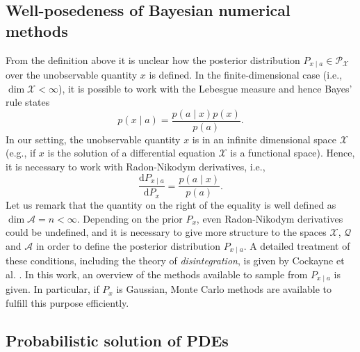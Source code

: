 \documentclass{scrartcl}
\theoremstyle{definition}
\theoremstyle{remark}
\numberwithin{definition}{section}
\numberwithin{remark}{section}
\newcommand{\dd}{\mathrm{d}}
\begin{document}
\subsection{Well-posedeness of Bayesian numerical methods}

From the definition above it is unclear how the posterior distribution $P_{x\mid a} \in \mathcal P_{\mathcal X}$ over the unobservable quantity $x$ is defined. In the finite-dimensional case (i.e., $\dim \mathcal X < \infty$), it is possible to work with the Lebesgue measure and hence Bayes' rule states
\begin{equation}
	p(x\mid a) = \frac{p(a\mid x)p(x)}{p(a)}.
\end{equation}
In our setting, the unobservable quantity $x$ is in an infinite dimensional space $\mathcal X$ (e.g., if $x$ is the solution of a differential equation $\mathcal X$ is a functional space). Hence, it is necessary to work with Radon-Nikodym derivatives, i.e.,
\begin{equation}
	\frac{\dd P_{x\mid a}}{\dd P_x} = \frac{p(a\mid x)}{p(a)}.
\end{equation}
Let us remark that the quantity on the right of the equality is well defined as $\dim \mathcal A = n < \infty$. Depending on the prior $P_x$, even Radon-Nikodym derivatives could be undefined, and it is necessary to give more structure to the spaces $\mathcal X$, $\mathcal Q$ and $\mathcal A$ in order to define the posterior distribution $P_{x\mid a}$. A detailed treatment of these conditions, including the theory of \textit{disintegration}, is given by Cockayne et al. \cite{COS17}. In this work, an overview of the methods available to sample from $P_{x\mid a}$ is given. In particular, if $P_x$ is Gaussian, Monte Carlo methods are available to fulfill this purpose efficiently.
 
\subsection{Probabilistic solution of PDEs}
\end{document}
